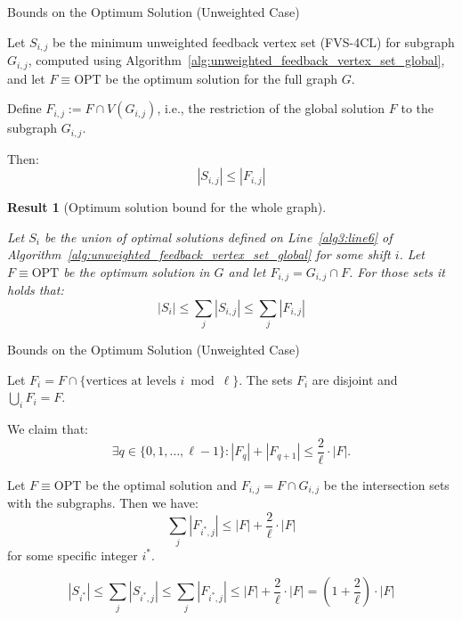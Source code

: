 \documentclass{beamer}
\newtheorem{result}{Result}
\begin{document}
\begin{frame}{Bounds on the Optimum Solution (Unweighted Case)}
    \footnotesize
    \begin{lemma}
    \label{lemma:opt-unweighted-fvs-4cl}

    Let \( S_{i,j} \) be the minimum unweighted feedback vertex set (FVS-4CL)
    for subgraph \( G_{i,j} \), computed using 
    Algorithm~\ref{alg:unweighted_feedback_vertex_set_global}, and let 
    \( F \equiv \text{OPT} \) be the optimum solution for the full graph \( G \).

    Define \( F_{i,j} := F \cap V(G_{i,j}) \), i.e., the restriction of the global solution \( F \) to the subgraph \( G_{i,j} \).

    Then:
    \[
    |S_{i,j}| \leq |F_{i,j}|
    \]
    \end{lemma}

    \begin{result}[Optimum solution bound for the whole graph]
    \label{result-two}

    Let \( S_i \) be the union of optimal solutions defined on Line~\ref{alg3:line6} of Algorithm~\ref{alg:unweighted_feedback_vertex_set_global} 
    for some shift \( i \). 
    Let \( F \equiv \text{OPT} \) be the optimum solution in \( G \) and let \( F_{i,j} = G_{i,j} \cap F \).
    For those sets it holds that:
    \[
    |S_i| \leq \sum_j |S_{i,j}| \leq \sum_j |F_{i,j}|
    \]
    \end{result}

\end{frame}

\begin{frame}{Bounds on the Optimum Solution (Unweighted Case)}
    \footnotesize
    \begin{lemma}
        \label{lemma-two}

        Let $F_i = F \cap \{\text{vertices at levels } i \bmod \ell\}$. 
        The sets $F_i$ are disjoint and $\bigcup_i F_i = F$.

        We claim that:
        \[
            \exists q \in \{0, 1, \dots, \ell-1\} : |F_q| + |F_{q+1}| \leq \frac{2}{\ell} \cdot |F| \text{.}
        \]
    \end{lemma}

    \begin{lemma}
    \label{lemma-three}
    Let \( F \equiv \text{OPT} \) be the optimal solution and \( F_{i,j} = F \cap G_{i,j} \) be the intersection 
    sets with the subgraphs. Then we have: 
    \[
    \sum_j |F_{i^*, j}| \leq |F| + \frac{2}{\ell} \cdot |F|
    \]
    for some specific integer \( i^* \).
    \end{lemma}

    \[
    |S_{i^*}| \leq \sum\limits_{j} |S_{i^*, j}| \leq \sum\limits_{j} |F_{i^*, j}| \leq |F| + \frac{2}{\ell} \cdot |F| = (1 + \frac{2}{\ell}) \cdot |F|
    \]

\end{frame}
\end{document}
